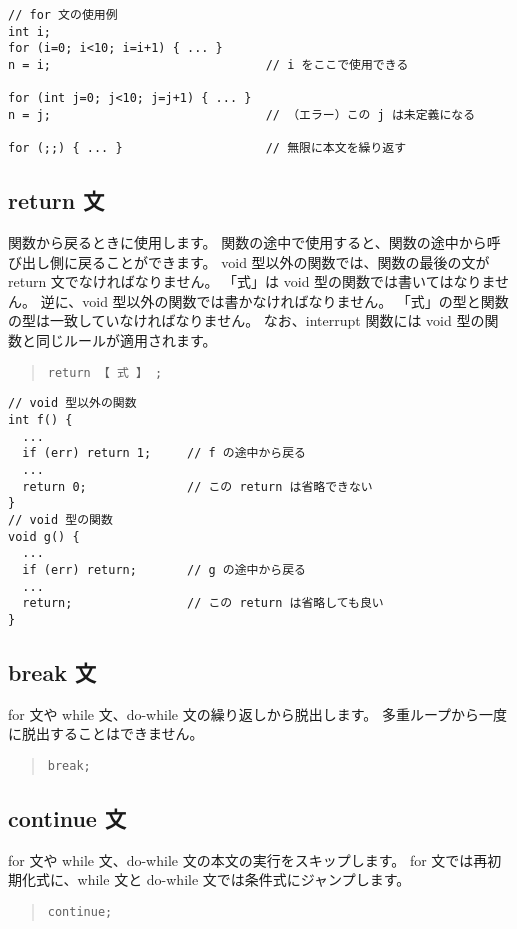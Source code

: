\begin{mylist}
\begin{verbatim}
// for 文の使用例
int i;
for (i=0; i<10; i=i+1) { ... }
n = i;                              // i をここで使用できる

for (int j=0; j<10; j=j+1) { ... }
n = j;                              // （エラー）この j は未定義になる

for (;;) { ... }                    // 無限に本文を繰り返す
\end{verbatim}
\end{mylist}

\subsection{return 文}

関数から戻るときに使用します。
関数の途中で使用すると、関数の途中から呼び出し側に戻ることができます。
void 型以外の関数では、関数の最後の文が return 文でなければなりません。
「式」は void 型の関数では書いてはなりません。
逆に、void 型以外の関数では書かなければなりません。
「式」の型と関数の型は一致していなければなりません。
なお、interrupt 関数には void 型の関数と同じルールが適用されます。

\begin{quote}
\begin{verbatim}
return 【 式 】 ;
\end{verbatim}
\end{quote}

\begin{mylist}
\begin{verbatim}
// void 型以外の関数
int f() {
  ...
  if (err) return 1;     // f の途中から戻る
  ...
  return 0;              // この return は省略できない
}
// void 型の関数
void g() {
  ...
  if (err) return;       // g の途中から戻る
  ...
  return;                // この return は省略しても良い
}
\end{verbatim}
\end{mylist}

\subsection{break 文}

for 文や while 文、do-while 文の繰り返しから脱出します。
多重ループから一度に脱出することはできません。

\begin{quote}
\begin{verbatim}
break;
\end{verbatim}
\end{quote}

\subsection{continue 文}

for 文や while 文、do-while 文の本文の実行をスキップします。
for 文では再初期化式に、while 文と do-while 文では条件式にジャンプします。

\begin{quote}
\begin{verbatim}
continue;
\end{verbatim}
\end{quote}
